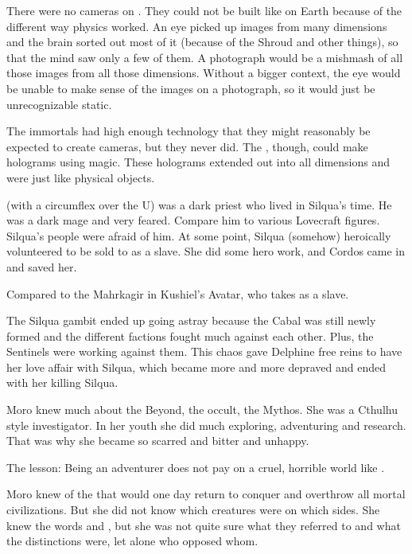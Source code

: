 There were no cameras on \Miith. 
They could not be built like on Earth because of the different way \Miithian physics worked. 
An eye picked up images from many dimensions and the brain sorted out most of it (because of the Shroud and other things), so that the mind saw only a few of them. 
A photograph would be a mishmash of all those images from all those dimensions. 
Without a bigger context, the eye would be unable to make sense of the images on a photograph, so it would just be unrecognizable static. 

The immortals had high enough technology that they might reasonably be expected to create cameras, but they never did. 
The \ophidians, though, could make holograms using magic. 
These holograms extended out into all dimensions and were just like physical objects. 



\Byakun (with a circumflex over the U) was a dark priest who lived in Silqua's time. 
He was a dark mage and very feared. 
Compare him to various Lovecraft figures. 
Silqua's people were afraid of him. 
At some point, Silqua (somehow) heroically volunteered to be sold to \Byakun as a slave. 
She did some hero work, and Cordos came in and saved her. 

Compared to the Mahrkagir in Kushiel's Avatar, who takes \Phedre as a slave. 



The Silqua gambit ended up going astray because the Cabal was still newly formed and the different factions fought much against each other. 
Plus, the Sentinels were working against them. 
This chaos gave Delphine free reins to have her love affair with Silqua, which became more and more depraved and ended with her killing Silqua. 



Moro \Cornel knew much about the Beyond, the occult, the \Miith Mythos. 
She was a Cthulhu style investigator. 
In her youth she did much exploring, adventuring and research. 
That was why she became so scarred and bitter and unhappy. 

The lesson: Being an adventurer does not pay on a cruel, horrible world like \Miith.

Moro knew of the  that would one day return to conquer \Miith and overthrow all mortal civilizations. 
But she did not know which creatures were on which sides. 
She knew the words \quo{\xs} and \quo{\bane}, but she was not quite sure what they referred to and what the distinctions were, let alone who opposed whom. 

